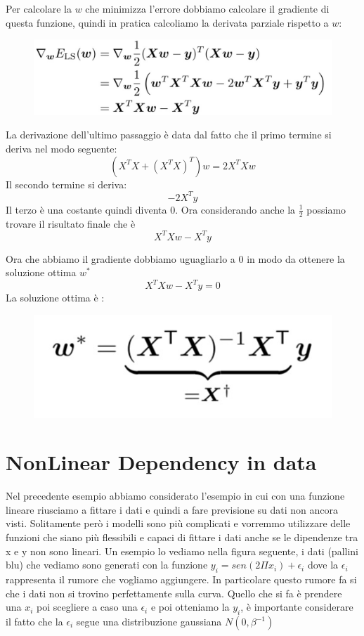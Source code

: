 \documentclass[14pt]{extreport}
\begin{document}
Per calcolare la $w$ che minimizza l'errore dobbiamo calcolare il gradiente di questa funzione, quindi in pratica calcoliamo la derivata parziale
rispetto a $w$:

\begin{figure}[H]
	\centering
	\includegraphics[width=0.6\linewidth]{69.jpeg}
\end{figure}

La derivazione dell'ultimo passaggio è data dal fatto che il primo termine si deriva nel modo seguente: $$(X^TX + (X^TX)^T)w = 2X^TXw$$ Il secondo
termine si deriva: $$-2X^Ty$$ Il terzo è una costante quindi diventa 0. Ora considerando anche la $\frac{1}{2}$ possiamo trovare il risultato finale
che è $$X^TXw-X^Ty$$

Ora che abbiamo il gradiente dobbiamo uguagliarlo a 0 in modo da ottenere la soluzione ottima $w^*$ $$X^TXw-X^Ty=0$$ La soluzione ottima è :

\begin{figure}[H]
	\centering
	\includegraphics[width=0.3\linewidth]{74.jpeg}
\end{figure}

\section{NonLinear Dependency in data}

Nel precedente esempio abbiamo considerato l'esempio in cui con una funzione lineare riusciamo a fittare i dati e quindi a fare previsione su dati non
ancora visti. Solitamente però i modelli sono più complicati e vorremmo utilizzare delle funzioni che siano più flessibili e capaci di fittare i dati
anche se le dipendenze tra x e y non sono lineari. Un esempio lo vediamo nella figura seguente, i dati (pallini blu) che vediamo sono generati con la
funzione $y_i=sen(2\Pi x_i) + \epsilon_i$ dove la $\epsilon_i$ rappresenta il rumore che vogliamo aggiungere. In particolare questo rumore fa si che i
dati non si trovino perfettamente sulla curva. Quello che si fa è prendere una $x_i$ poi scegliere a caso una $\epsilon_i$ e poi otteniamo la $y_i$, è
importante considerare il fatto che la $\epsilon_i$ segue una distribuzione gaussiana $N(0, \beta^{-1})$
\end{document}
